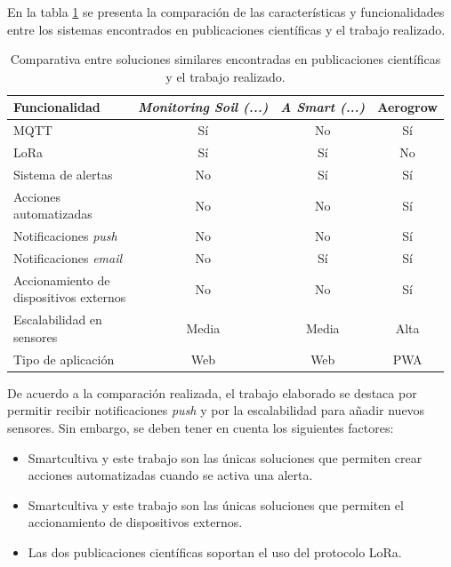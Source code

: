 En la tabla \ref{tab:comparativaTrabajoSolucionesPublicacionesCientificas} se presenta la comparación de las características y funcionalidades entre los sistemas encontrados en publicaciones científicas y el trabajo realizado.

\begin{table}[H]
	\centering
	\caption[Comparativa entre soluciones similares encontradas en publicaciones científicas y el trabajo realizado]{Comparativa entre soluciones similares encontradas en publicaciones científicas y el trabajo realizado.}
	\begin{tabular}{l c c c}    
		\toprule 
		\textbf{Funcionalidad} & \textbf{\textit{Monitoring Soil (...)}} & \textbf{\textit{A Smart (...)}}  & \textbf{Aerogrow}\\
		\midrule
		MQTT & Sí & No  & Sí\\
		LoRa & Sí & Sí  & No\\
		Sistema de alertas & No & Sí & Sí\\
		\shortstack{Acciones \\ automatizadas} & No & No & Sí\\
		Notificaciones \emph{push} & No & No & Sí\\
		Notificaciones \textit{email} & No & Sí & Sí\\
		\shortstack{Accionamiento de \\ dispositivos externos} & No & No & Sí\\
		\shortstack{Escalabilidad en \\ sensores} & Media & Media & Alta\\
		Tipo de aplicación & Web & Web & PWA\\
		\bottomrule
		\hline
	\end{tabular}
	\label{tab:comparativaTrabajoSolucionesPublicacionesCientificas}
\end{table}

De acuerdo a la comparación realizada, el trabajo elaborado se destaca por permitir recibir notificaciones \emph{push} y por la escalabilidad para añadir nuevos sensores. Sin embargo, se deben tener en cuenta los siguientes factores:

\begin{itemize}
\item Smartcultiva y este trabajo son las únicas soluciones que permiten crear acciones automatizadas cuando se activa una alerta. 
\item Smartcultiva y este trabajo son las únicas soluciones que permiten el accionamiento de dispositivos externos.
\item Las dos publicaciones científicas soportan el uso del protocolo LoRa.
\end{itemize}